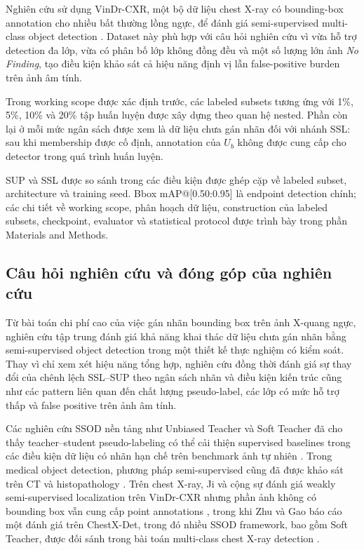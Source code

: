 \documentclass[pdflatex,sn-mathphys-num]{sn-jnl}%
\theoremstyle{thmstyleone}%
\theoremstyle{thmstyletwo}%
\theoremstyle{thmstylethree}%
\begin{document}
Nghiên cứu sử dụng VinDr-CXR, một bộ dữ liệu chest X-ray có bounding-box
annotation cho nhiều bất thường lồng ngực, để đánh giá semi-supervised
multi-class object detection \cite{nguyen2022vindr}. Dataset này phù hợp với
câu hỏi nghiên cứu vì vừa hỗ trợ detection đa lớp, vừa có phân bố lớp không đồng
đều và một số lượng lớn ảnh \textit{No Finding}, tạo điều kiện khảo sát cả hiệu
năng định vị lẫn false-positive burden trên ảnh âm tính.

Trong working scope được xác định trước, các labeled subsets tương ứng với
1\%, 5\%, 10\% và 20\% tập huấn luyện được xây dựng theo quan hệ nested. Phần
còn lại ở mỗi mức ngân sách được xem là dữ liệu chưa gán nhãn đối với nhánh SSL:
sau khi membership được cố định, annotation của \(U_b\) không được cung cấp cho
detector trong quá trình huấn luyện.

SUP và SSL được so sánh trong các điều kiện được ghép cặp về labeled subset,
architecture và training seed. Bbox mAP@[0.50:0.95] là endpoint detection chính;
các chi tiết về working scope, phân hoạch dữ liệu, construction của labeled
subsets, checkpoint, evaluator và statistical protocol được trình bày trong
phần Materials and Methods.

\subsection{Câu hỏi nghiên cứu và đóng góp của nghiên cứu}
\label{subsec:research_questions_contributions}

Từ bài toán chi phí cao của việc gán nhãn bounding box trên ảnh X-quang ngực,
nghiên cứu tập trung đánh giá khả năng khai thác dữ liệu chưa gán nhãn bằng
semi-supervised object detection trong một thiết kế thực nghiệm có kiểm soát. Thay vì chỉ xem xét hiệu năng tổng hợp, nghiên cứu đồng thời đánh giá sự thay đổi của chênh lệch SSL--SUP
theo ngân sách nhãn và điều kiện kiến trúc cũng như các
pattern liên quan đến chất lượng pseudo-label, các lớp có mức hỗ trợ thấp và
false positive trên ảnh âm tính.

Các nghiên cứu SSOD nền tảng như Unbiased Teacher và Soft Teacher đã cho thấy
teacher--student pseudo-labeling có thể cải thiện supervised baselines trong
các điều kiện dữ liệu có nhãn hạn chế trên benchmark ảnh tự nhiên
\cite{liu2021unbiased,xu2021end}. Trong medical object detection, phương pháp
semi-supervised cũng đã được khảo sát trên CT và histopathology
\cite{wang2020focalmix,wen2024robust}. Trên chest X-ray, Ji và cộng sự đánh giá
weakly semi-supervised localization trên VinDr-CXR nhưng phần ảnh không có
bounding box vẫn cung cấp point annotations \cite{ji2022benchmark}, trong khi
Zhu và Gao báo cáo một đánh giá trên ChestX-Det, trong đó nhiều SSOD framework,
bao gồm Soft Teacher, được đối sánh trong bài toán multi-class chest X-ray
detection \cite{zhu2025entropy}.
\end{document}
